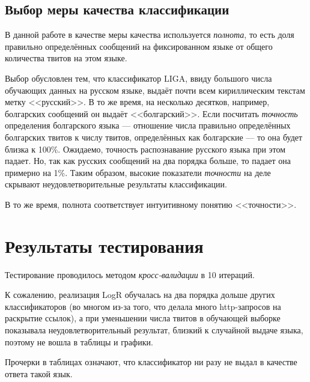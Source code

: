 \documentclass[a4paper, 14pt]{article}
\begin{document}
		\subsection{Выбор меры качества классификации}
		В данной работе в качестве меры качества используется \textit{полнота}, то есть доля правильно определённых сообщений на фиксированном языке
		от общего количества твитов на этом языке.
		
		Выбор обусловлен тем, что классификатор LIGA, ввиду большого числа обучающих данных на русском языке,
		выдаёт почти всем кириллическим текстам метку <<русский>>. В то же время, на несколько десятков, например, болгарских сообщений он выдаёт 
		<<болгарский>>. Если посчитать \textit{точность} определения болгарского языка --- отношение числа правильно определённых болгарских твитов 
		к числу твитов, определённых как болгарские --- то она будет близка к 100\%. Ожидаемо, точность распознавание русского языка при этом падает.
		Но, так как русских сообщений на два порядка больше, то падает она примерно на 1\%. Таким образом, высокие показатели \textit{точности} на деле
		скрывают неудовлетворительные результаты классификации.
		
		В то же время, полнота соответствует интуитивному понятию <<точности>>.
       
\section{Результаты тестирования}
		Тестирование проводилось методом \textit{кросс-валидации} в 10 итераций.
		
		К сожалению, реализация LogR обучалась на два порядка дольше других классификаторов (во многом из-за того, что делала много http-запросов
		на раскрытие ссылок), а при уменьшении числа твитов в обучающей выборке показывала неудовлетворительный результат, близкий к случайной
		выдаче языка, поэтому не вошла в таблицы и графики.
		
		Прочерки в таблицах означают, что классификатор ни разу не выдал в качестве ответа такой язык.
		
\end{document}
